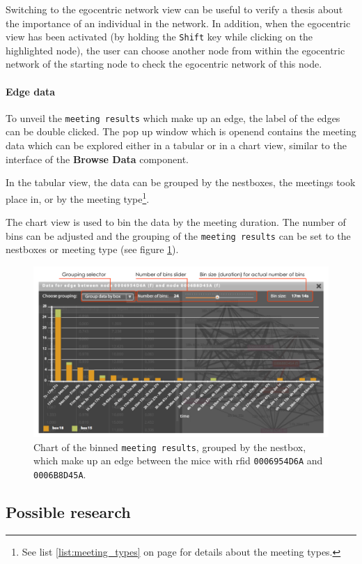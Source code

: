 Switching to the egocentric network view can be useful to verify a thesis about the importance of an individual in the network. In addition, when the egocentric view has been activated (by holding the \lstinline|Shift| key while clicking on the highlighted node), the user can choose another node from within the egocentric network of the starting node to check the egocentric network of this node.

\paragraph{Edge data}

To unveil the \lstinline|meeting results| which make up an edge, the label of the edges can be double clicked. The pop up window which is openend contains the meeting data which can be explored either in a tabular or in a chart view, similar to the interface of the \textbf{Browse Data} component.

In the tabular view, the data can be grouped by the nestboxes, the meetings took place in, or by the meeting type\footnote{See list \ref{list:meeting_types} on page \pageref{list:meeting_types} for details about the meeting types.}.

The chart view is used to bin the data by the meeting duration. The number of bins can be adjusted and the grouping of the \lstinline|meeting results| can be set to the nestboxes or meeting type (see figure \ref{fig:edge_data_panel_chart}).

\begin{figure}[!htpb]
\begin{center}
  \includegraphics[width=\textwidth]{assets/pdf/edge_data_panel_chart.pdf}
  \caption[Edge data chart]{Chart of the binned \lstinline|meeting results|, grouped by the nestbox, which make up an edge between the mice with rfid \lstinline|0006954D6A| and \lstinline|0006B8D45A|.}
  \label{fig:edge_data_panel_chart}
\end{center}
\end{figure}   

\subsection{Possible research}
\label{subsec:graph_research}
